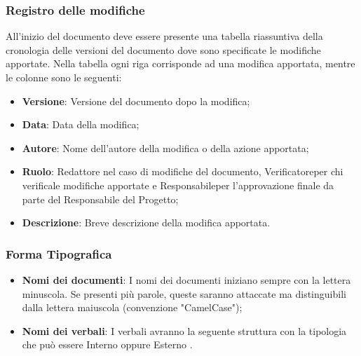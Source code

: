 \subsubsection{Registro delle modifiche}\label{Registro}
All’inizio del documento deve essere presente una tabella riassuntiva della cronologia delle versioni del documento dove sono specificate le modifiche apportate.
Nella tabella ogni riga corrisponde ad una modifica apportata, mentre le colonne sono le seguenti:
\begin{itemize}
    \item \textbf{Versione}: Versione del documento dopo la modifica;
    \item \textbf{Data}: Data della modifica;
    \item \textbf{Autore}: Nome dell’autore della modifica o della azione apportata;
    \item \textbf{Ruolo}: Redattore nel caso di modifiche del documento, Verificatore\glo per chi verifica\glo le modifiche apportate e Responsabile\glo per l’approvazione finale da parte del Responsabile del Progetto;
    \item \textbf{Descrizione}: Breve descrizione della modifica apportata.
\end{itemize}

\subsubsection{Forma Tipografica}
\begin{itemize}
  \item \textbf{Nomi dei documenti}: I nomi dei documenti iniziano sempre con la lettera minuscola. Se presenti più parole, queste saranno attaccate ma distinguibili dalla lettera maiuscola (convenzione "CamelCase");
  \item \textbf{Nomi dei verbali}: I verbali avranno la seguente struttura  con la tipologia che può essere Interno  oppure Esterno .
\end{itemize}


